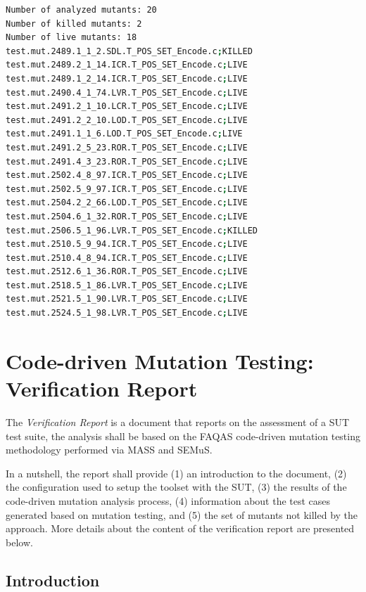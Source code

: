 \begin{lstlisting}[language=bash, label=semus_output, caption=SEMuS output.]
Number of analyzed mutants: 20
Number of killed mutants: 2
Number of live mutants: 18
test.mut.2489.1_1_2.SDL.T_POS_SET_Encode.c;KILLED
test.mut.2489.2_1_14.ICR.T_POS_SET_Encode.c;LIVE
test.mut.2489.1_2_14.ICR.T_POS_SET_Encode.c;LIVE
test.mut.2490.4_1_74.LVR.T_POS_SET_Encode.c;LIVE
test.mut.2491.2_1_10.LCR.T_POS_SET_Encode.c;LIVE
test.mut.2491.2_2_10.LOD.T_POS_SET_Encode.c;LIVE
test.mut.2491.1_1_6.LOD.T_POS_SET_Encode.c;LIVE
test.mut.2491.2_5_23.ROR.T_POS_SET_Encode.c;LIVE
test.mut.2491.4_3_23.ROR.T_POS_SET_Encode.c;LIVE
test.mut.2502.4_8_97.ICR.T_POS_SET_Encode.c;LIVE
test.mut.2502.5_9_97.ICR.T_POS_SET_Encode.c;LIVE
test.mut.2504.2_2_66.LOD.T_POS_SET_Encode.c;LIVE
test.mut.2504.6_1_32.ROR.T_POS_SET_Encode.c;LIVE
test.mut.2506.5_1_96.LVR.T_POS_SET_Encode.c;KILLED
test.mut.2510.5_9_94.ICR.T_POS_SET_Encode.c;LIVE
test.mut.2510.4_8_94.ICR.T_POS_SET_Encode.c;LIVE
test.mut.2512.6_1_36.ROR.T_POS_SET_Encode.c;LIVE
test.mut.2518.5_1_86.LVR.T_POS_SET_Encode.c;LIVE
test.mut.2521.5_1_90.LVR.T_POS_SET_Encode.c;LIVE
test.mut.2524.5_1_98.LVR.T_POS_SET_Encode.c;LIVE
\end{lstlisting}


\section{Code-driven Mutation Testing: Verification Report}


The \emph{Verification Report} is a document that reports on the assessment of a SUT test suite, the analysis shall be based on the FAQAS code-driven mutation testing methodology performed via MASS and SEMuS.

In a nutshell, the report shall provide (1) an introduction to the document, (2) the configuration used to setup the toolset with the SUT, (3) the results of the code-driven mutation analysis process, (4) information about the test cases generated based on mutation testing, and (5) the set of mutants not killed by the approach. More details about the content of the verification report are presented below.

\subsection{Introduction}

